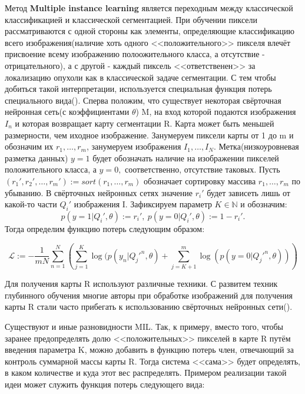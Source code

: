 Метод {\bf Multiple instance learning} является переходным между классической классификацией и классической сегментацией.
При обучении пиксели рассматриваются с одной стороны как элементы, определяющие классификацию всего изображения(наличие хоть одного
<<положительного>> пикселя влечёт присвоение всему изображению полоожительного класса, а отсутствие - отрицательного), а с другой - 
каждый пиксель <<ответственен>> за локализацию опухоли как в классической задаче сегментации. С тем чтобы добиться такой интерпретации, 
используется специальная функция потерь специального вида(\cite{zhu_deep_2016}). Сперва положим, что существует некоторая свёрточная нейронная сеть(с коэффициентами $\theta$) M, на вход которой подаются изображения $I_n$ и которая возвращает карту сегментации R. Карта может быть меньшей размерности, чем иходное изображение. Занумеруем пиксели карты  от 1 до m и обозначим их $r_1, \dots, r_m$, занумеруем изображения $I_1, \dots, I_N$. Метка(низкоуровневая разметка данных) $y=1$ будет обозначать наличие на изображении пикселей положительного класса, а $y = 0,$  соответственно, отсутствие таковых. Пусть $(r_1', r_2',\dots, r_m') := sort(r_1, \dots, r_m )$ обозначает сортировку массива $r_1, \dots, r_m$ по убыванию. В свёрточных нейронных сетях значение $r_i'$ будет зависеть лишь от какой-то части $Q_i'$ изображения I. Зафиксируем параметр $K\in\mathbb{N}$ и обозначим: 
$$p(y=1|Q_i', \theta):= r_i', ~p(y=0|Q_i',\theta):= 1 - r_i'.$$ Тогда определим функцию потерь следующим образом:

\begin{equation}
  \label{eq:equation1}
  \mathcal{L} := -\frac{1}{mN}\sum_{n=1}^N\left( \sum_{j=1}^K\log(p(y_n|Q_{j}'^n,\theta)+\sum_{j=K+1}^m\log(p(y=0|Q_{j}'^n,\theta))\right)
\end{equation}


Для получения карты R используют различные техники.  С развитем техник глубинного обучения многие авторы при обработке изображений 
для получения карты R стали часто прибегать к использованию свёрточных нейронных сети(\cite{quellec_multiple-instance_2017}).

Существуют и иные разновидности MIL. Так, к примеру, вместо того, чтобы заранее предопределять долю <<положительных>> пикселей в карте R путём введения параметра K, можно добавить в функцию потерь член, отвечающий за контроль суммарной массы карты R. Тогда система <<сама>> будет определять, в каком количестве и куда этот вес распределять. Примером реализации такой идеи может служить функция потерь следующего вида: 


